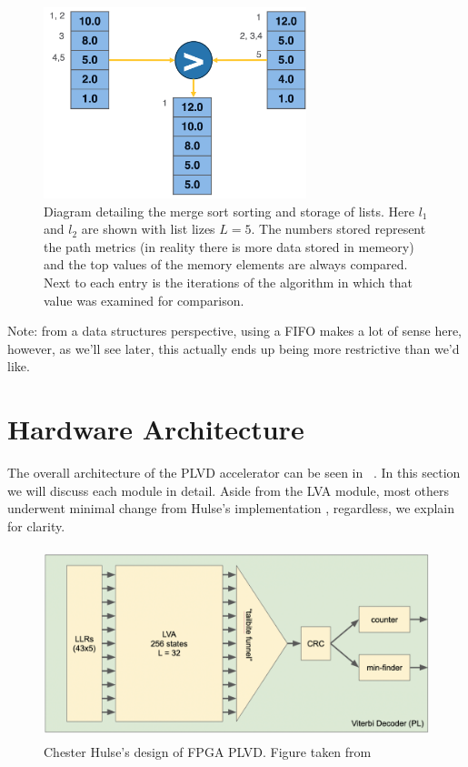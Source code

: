 \begin{figure}
\centering\CaptionFontSize
\includegraphics[height=15em]
{Figures/merge_sort.png}
\caption[Diagram detailing the merge sort sorting and storage of lists]
{Diagram detailing the merge sort sorting and storage of lists. Here $l_1$ and $l_2$ are shown with list lizes $L=5$. The numbers stored represent the path metrics (in reality there is more data stored in memeory) and the top values of the memory elements are always compared. Next to each entry is the iterations of the algorithm in which that value was examined for comparison.}
\label{Figure:DecoderHW:MergeSort}
\end{figure}

Note: from a data structures perspective, using a FIFO makes a lot of sense here, however, as we’ll see later, this actually ends up being more restrictive than we’d like.

\section{Hardware Architecture}
The overall architecture of the PLVD accelerator can be seen in \Figure~. In this section we will discuss each module in detail. Aside from the LVA module, most others underwent minimal change from Hulse’s implementation \cite{ChesterPaper}, regardless, we explain for clarity.

\begin{figure}
\centering\CaptionFontSize
\includegraphics[height=15em]
{Figures/old_architecture.png}
\caption[Chester Hulse's design of FPGA PLVD]
{Chester Hulse's design of FPGA PLVD. Figure taken from \cite{ChesterPaper}}
\label{Figure:DecoderHW:OldArchitecture}
\end{figure}

